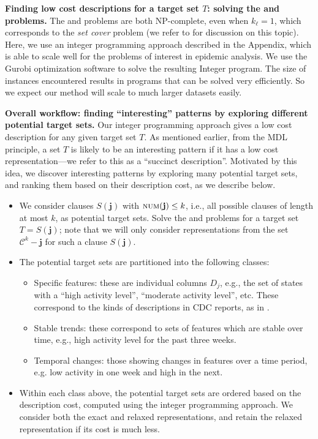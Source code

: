 \noindent
\textbf{Finding low cost descriptions for a target set $T$: solving the \mindesc{}
and \minapproxdesc{} problems.}
The \mindesc{} and \minapproxdesc{} problems are both
NP-complete, even when $k_{\ell}= 1$, which corresponds to the \emph{set cover}
problem (we refer to \cite{GareyJohnson} for discussion on this topic). 
Here, we use an integer programming
approach described in the Appendix,
which is able to scale well for the problems of interest in epidemic analysis. 
We use the Gurobi optimization software \cite{gurobi}
to solve the resulting Integer program. The size of instances encountered results in programs 
that can be solved very efficiently. So we expect our method will scale to much larger datasets easily. 


\noindent
\textbf{Overall workflow: finding ``interesting'' patterns by
exploring different potential target sets.}
Our integer programming approach gives a low cost description for any given target
set $T$. As mentioned earlier, from the MDL principle, a set $T$ is likely
to be an interesting pattern if it has a low cost representation---we
refer to this as a ``succinct description''.
Motivated by this idea, we discover interesting patterns by exploring
many potential target sets, and ranking them based on their description cost,
as we describe below.
\begin{itemize}
\item
We consider clauses $S(\mathbf{j})$ with $\textsc{num}(\mathbf{j})\leq k$, i.e.,
all possible clauses of length at most $k$, as potential target sets.
Solve the \mindesc{} and \minapproxdesc{} problems for a target set $T=S(\mathbf{j})$;
note that we will only consider representations from the set
$\mathcal{C}^k-\mathbf{j}$ for such a clause $S(\mathbf{j})$.
\item
The potential target sets are partitioned into the following classes:
\begin{itemize}
\item
Specific features: these are individual columns $D_j$, e.g., the set of states
with a ``high activity level'', ``moderate activity level'', etc. These correspond
to the kinds of descriptions in CDC reports, as in \cite{cdc:surveillance-report-feb10}.
\item
Stable trends: these correspond to sets of features which are stable over time, e.g., high activity level for the past three weeks.
\item
Temporal changes: those showing changes in features over a time period, e.g.
low activity in one week and high in the next.
\end{itemize}
\item
Within each class above, the potential target sets are ordered based on the
description cost, computed using the integer programming approach.
We consider both the exact and relaxed representations, and retain
the relaxed representation if its cost is much less.
\end{itemize}

